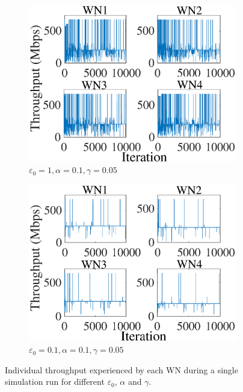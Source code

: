 \documentclass{article}
\begin{document}
\begin{figure}[]
\begin{subfigure}[b]{0.225\textwidth}
			\includegraphics[width=\textwidth]{images/e_1_a_01_g_005_ind_tpt}
			\caption{$\varepsilon_0=1, \alpha=0.1, \gamma=0.05$}
			\label{fig:e_1_a_01_g_005_ind_tpt}
		\end{subfigure}
		\begin{subfigure}[b]{0.225\textwidth}
			\includegraphics[width=\textwidth]{images/e_01_a_01_g_005_ind_tpt}
			\caption{$\varepsilon_0=0.1, \alpha=0.1, \gamma=0.05$}
			\label{fig:e_01_a_01_g_005_ind_tpt}
		\end{subfigure}
		\caption{Individual throughput experienced by each WN during a single simulation run for different $\varepsilon_0$, $\alpha$ and $\gamma$.}
		\label{fig:ql_params_eval_individual_tpt}
	\end{figure}
	
\end{document}

